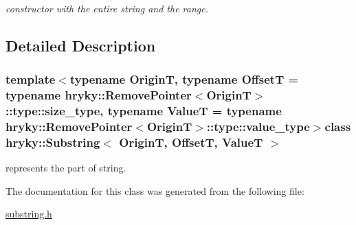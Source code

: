 \begin{DoxyCompactItemize}
\begin{DoxyCompactList}\small\item\em constructor with the entire string and the range. \end{DoxyCompactList}\end{DoxyCompactItemize}


\subsection{Detailed Description}
\subsubsection*{template$<$typename Origin\-T, typename Offset\-T = typename hryky\-::\-Remove\-Pointer$<$\-Origin\-T$>$\-::type\-::size\-\_\-type, typename Value\-T = typename hryky\-::\-Remove\-Pointer$<$\-Origin\-T$>$\-::type\-::value\-\_\-type$>$class hryky\-::\-Substring$<$ Origin\-T, Offset\-T, Value\-T $>$}

represents the part of string. 

The documentation for this class was generated from the following file\-:\begin{DoxyCompactItemize}
\item 
\hyperlink{substring_8h}{substring.\-h}\end{DoxyCompactItemize}
